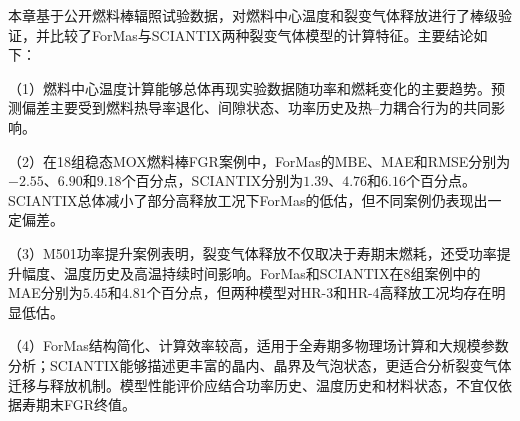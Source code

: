 本章基于公开燃料棒辐照试验数据，对燃料中心温度和裂变气体释放进行了棒级验证，并比较了ForMas与SCIANTIX两种裂变气体模型的计算特征。主要结论如下：

（1）燃料中心温度计算能够总体再现实验数据随功率和燃耗变化的主要趋势。预测偏差主要受到燃料热导率退化、间隙状态、功率历史及热--力耦合行为的共同影响。

（2）在18组稳态MOX燃料棒FGR案例中，ForMas的MBE、MAE和RMSE分别为$-2.55$、$6.90$和$9.18$个百分点，SCIANTIX分别为$1.39$、$4.76$和$6.16$个百分点。SCIANTIX总体减小了部分高释放工况下ForMas的低估，但不同案例仍表现出一定偏差。

（3）M501功率提升案例表明，裂变气体释放不仅取决于寿期末燃耗，还受功率提升幅度、温度历史及高温持续时间影响。ForMas和SCIANTIX在8组案例中的MAE分别为$5.45$和$4.81$个百分点，但两种模型对HR-3和HR-4高释放工况均存在明显低估。

（4）ForMas结构简化、计算效率较高，适用于全寿期多物理场计算和大规模参数分析；SCIANTIX能够描述更丰富的晶内、晶界及气泡状态，更适合分析裂变气体迁移与释放机制。模型性能评价应结合功率历史、温度历史和材料状态，不宜仅依据寿期末FGR终值。
